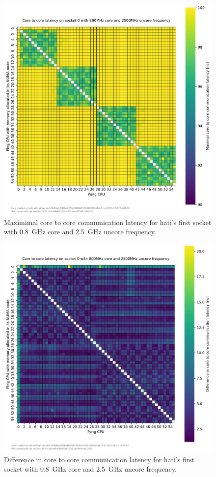 \begin{figure}[]
    \centering
    \includegraphics[width=\columnwidth]{fig/core-to-core-latency/core-to-core-heatmap-max-800-2500.pdf}
    \caption{Maximimal core to core communication latency for hati's first socket with \SI{0.8}{\GHz} core and \SI{2.5}{\GHz} uncore frequency.}
\end{figure}
\begin{figure}[]
    \centering
    \includegraphics[width=\columnwidth]{fig/core-to-core-latency/core-to-core-heatmap-diff-800-2500.pdf}
    \caption{Difference in core to core communication latency for hati's first socket with \SI{0.8}{\GHz} core and \SI{2.5}{\GHz} uncore frequency.}
\end{figure}

